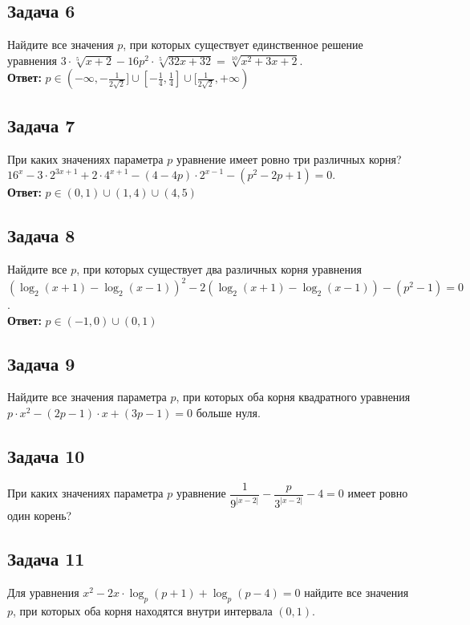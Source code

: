 \subsection * {Задача 6}
Найдите все значения $p$, при которых существует единственное решение уравнения
$3\cdot\sqrt[5]{x+2} - 16p^2\cdot\sqrt[5]{32x+32} = \sqrt[10]{x^2 + 3x + 2}$.\\
\textbf{Ответ:}
$p\in(-\infty,-\frac{1}{2\sqrt2}]\cup[-\frac{1}{4},\frac{1}{4}]\cup[\frac{1}{2\sqrt2},+\infty)$\\

\pagebreak

\subsection * {Задача 7}
При каких значениях параметра $p$ уравнение имеет ровно три различных корня?
$16^x -3 \cdot 2^{3x + 1} + 2 \cdot 4^{x + 1} - (4 - 4p) \cdot 2^{x - 1} - (p^2 - 2p + 1) = 0$.\\
\textbf{Ответ:} $p \in (0, 1) \cup (1, 4) \cup (4, 5)$\\

\subsection * {Задача 8}
Найдите все $p$, при которых существует два различных корня уравнения
$(\log_2{(x+1)} - \log_2{(x-1)})^2 - 2(\log_2{(x+1)} - \log_2{(x-1)}) - (p^2 - 1) = 0$.\\
\textbf{Ответ:} $p \in (-1, 0) \cup (0, 1)$

\subsection * {Задача 9}
Найдите все значения параметра $p$, при которых оба корня квадратного уравнения
$p \cdot x^2 - (2p-1) \cdot x + (3p - 1) = 0$ больше нуля.\\

\subsection * {Задача 10}
При каких значениях параметра $p$ уравнение $\dfrac{1}{9^{|x-2|}} - \dfrac{p}{3^{|x-2|}} - 4 = 0$
имеет ровно один корень?\\

\subsection * {Задача 11}
Для уравнения $x^2 - 2x \cdot \log_p{(p + 1)} + \log_p{(p - 4)} = 0$ найдите все значения $p$, при
которых оба корня находятся внутри интервала $(0, 1)$.\\

